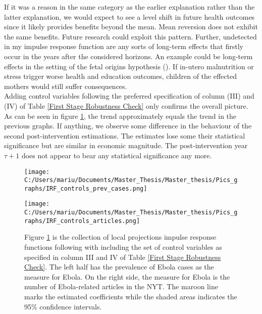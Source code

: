 \documentclass{article}
\begin{document}
If it was a reason in the same category as the earlier explanation rather than the latter explanation, we would expect to see a level shift in future health outcomes since it likely provides benefits beyond the mean. Mean reversion does not exhibit the same benefits. Future research could exploit this pattern. Further, undetected in my impulse response function are any sorts of long-term effects that firstly occur in the years after the considered horizons. An example could be long-term effects in the setting of the fetal origins hypothesis (\cite{almond2011killing}). If in-utero malnutrition or stress trigger worse health and education outcomes, children of the effected mothers would still suffer consequences. \\
Adding control variables following the preferred specification of column (III) and (IV) of Table \ref{First Stage Robustness Check} only confirms the overall picture. As can be seen in figure \ref{First Stage IRF - with controls}, the trend approximately equals the trend in the previous graphs. If anything, we observe some difference in the behaviour of the second post-intervention estimations. The estimates lose some their statistical significance but are similar in economic magnitude. The post-intervention year $\tau + 1$ does not appear to bear any statistical significance any more.

\begin{figure}[!ht]
\begin{center}
\begin{minipage}[t]{0.9\textwidth}
\begin{minipage}[t]{0.5\linewidth}\vspace{0pt} 
\texttt{[image: C:/Users/mariu/Documents/Master\_Thesis/Master\_thesis/Pics\_graphs/IRF\_controls\_prev\_cases.png]}\\
\end{minipage}\hfill%
\begin{minipage}[t]{0.5\linewidth}\vspace{0pt} 
\texttt{[image: C:/Users/mariu/Documents/Master\_Thesis/Master\_thesis/Pics\_graphs/IRF\_controls\_articles.png]}\\
\end{minipage}\hfill%
\caption{Figure \ref{First Stage IRF - with controls} is the collection of local projections impulse response functions following \cite{jorda2005estimation} with including the set of control variables as specified in column III and IV of Table \ref{First Stage Robustness Check}. The left half has the prevalence of Ebola cases as the measure for Ebola. On the right side, the measure for Ebola is the number of Ebola-related articles in the NYT. The maroon line marks the estimated coefficients while the shaded areas indicates the 95\% confidence intervals.}
\label{First Stage IRF - with controls}
\end{minipage}
\end{center}
\end{figure}
\end{document}
